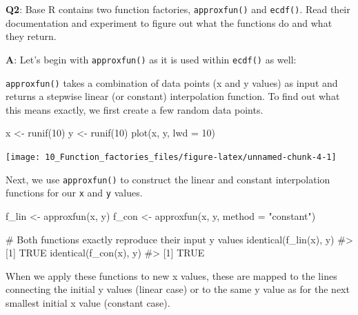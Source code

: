 \documentclass[
]{krantz}
\makeatletter
\newenvironment{Shaded}{\begin{snugshade}}{\end{snugshade}}
\newcommand{\CommentTok}[1]{\textcolor[rgb]{0.56,0.35,0.01}{\textit{#1}}}
\newcommand{\DataTypeTok}[1]{\textcolor[rgb]{0.13,0.29,0.53}{#1}}
\newcommand{\DecValTok}[1]{\textcolor[rgb]{0.00,0.00,0.81}{#1}}
\newcommand{\KeywordTok}[1]{\textcolor[rgb]{0.13,0.29,0.53}{\textbf{#1}}}
\newcommand{\NormalTok}[1]{#1}
\newcommand{\StringTok}[1]{\textcolor[rgb]{0.31,0.60,0.02}{#1}}
\newenvironment{kframe}{%
\medskip{}
\setlength{\fboxsep}{.8em}
 \def\at@end@of@kframe{}%
 \ifinner\ifhmode%
  \def\at@end@of@kframe{\end{minipage}}%
  \begin{minipage}{\columnwidth}%
 \fi\fi%
 \def\FrameCommand##1{\hskip\@totalleftmargin \hskip-\fboxsep
 \colorbox{shadecolor}{##1}\hskip-\fboxsep
     \hskip-\linewidth \hskip-\@totalleftmargin \hskip\columnwidth}%
 \MakeFramed {\advance\hsize-\width
   \@totalleftmargin\z@ \linewidth\hsize
   \@setminipage}}%
 {\par\unskip\endMakeFramed%
 \at@end@of@kframe}
\renewenvironment{Shaded}{\begin{kframe}}{\end{kframe}}
\renewcommand{\KeywordTok} [1]{\textcolor[rgb]{0.00,0.44,0.13}{{#1}}}
\renewcommand{\DataTypeTok}[1]{\textcolor[rgb]{0.56,0.13,0.00}{{#1}}}
\renewcommand{\DecValTok}  [1]{\textcolor[rgb]{0.25,0.63,0.44}{{#1}}}
\renewcommand{\StringTok}  [1]{\textcolor[rgb]{0.25,0.44,0.63}{{#1}}}
\renewcommand{\CommentTok} [1]{\textcolor[rgb]{0.38,0.63,0.69}{{#1}}}
\renewcommand{\NormalTok}  [1]{{#1}}
\makeatother
\begin{document}
\textbf{{Q2}}: Base R contains two function factories, \texttt{approxfun()} and \texttt{ecdf()}. Read their documentation and experiment to figure out what the functions do and what they return.

\textbf{{A}}: Let's begin with \texttt{approxfun()} as it is used within \texttt{ecdf()} as well:

\texttt{approxfun()} takes a combination of data points (x and y values) as input and returns a stepwise linear (or constant) interpolation function. To find out what this means exactly, we first create a few random data points.

\begin{Shaded}
\begin{Highlighting}[]
\NormalTok{x <-}\StringTok{ }\KeywordTok{runif}\NormalTok{(}\DecValTok{10}\NormalTok{)}
\NormalTok{y <-}\StringTok{ }\KeywordTok{runif}\NormalTok{(}\DecValTok{10}\NormalTok{)}
\KeywordTok{plot}\NormalTok{(x, y, }\DataTypeTok{lwd =} \DecValTok{10}\NormalTok{)}
\end{Highlighting}
\end{Shaded}

\begin{center}\texttt{[image: 10\_Function\_factories\_files/figure-latex/unnamed-chunk-4-1]} \end{center}

Next, we use \texttt{approxfun()} to construct the linear and constant interpolation functions for our \texttt{x} and \texttt{y} values.

\begin{Shaded}
\begin{Highlighting}[]
\NormalTok{f_lin <-}\StringTok{ }\KeywordTok{approxfun}\NormalTok{(x, y)}
\NormalTok{f_con <-}\StringTok{ }\KeywordTok{approxfun}\NormalTok{(x, y, }\DataTypeTok{method =} \StringTok{"constant"}\NormalTok{)}

\CommentTok{# Both functions exactly reproduce their input y values}
\KeywordTok{identical}\NormalTok{(}\KeywordTok{f_lin}\NormalTok{(x), y)}
\CommentTok{#> [1] TRUE}
\KeywordTok{identical}\NormalTok{(}\KeywordTok{f_con}\NormalTok{(x), y)}
\CommentTok{#> [1] TRUE}
\end{Highlighting}
\end{Shaded}

When we apply these functions to new x values, these are mapped to the lines connecting the initial y values (linear case) or to the same y value as for the next smallest initial x value (constant case).
\end{document}
